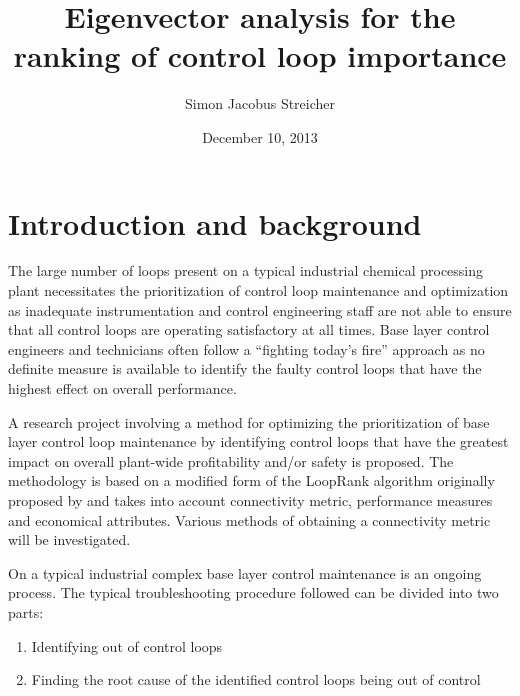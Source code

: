 \documentclass{article}
\newcommand{\subtitle}[1]{%
  \posttitle{%
    \par\end{center}
    \begin{center}\Large#1\end{center}
    \vskip0.5em}%
  }
\begin{document}


\title{Eigenvector analysis for the ranking of control loop importance}
\subtitle{Research proposal}
\date{December 10, 2013}
\author{Simon Jacobus Streicher}
\maketitle
\thispagestyle{empty}

\newpage

\tableofcontents
\thispagestyle{empty}




\newpage
{}
\pagestyle{fancy}

\section{Introduction and background}

The large number of loops present on a typical industrial chemical processing plant necessitates the prioritization of control loop maintenance and optimization as inadequate instrumentation and control engineering staff are not able to ensure that all control loops are operating satisfactory at all times.
Base layer control engineers and technicians often follow a “fighting today's fire” approach as no definite measure is available to identify the faulty control loops that have the highest effect on overall performance.

A research project involving a method for optimizing the prioritization of base layer control loop maintenance by identifying control loops that have the greatest impact on overall plant-wide profitability and/or safety is proposed.
The methodology is based on a modified form of the LoopRank algorithm originally proposed by \citet{Farenzena2009} and takes into account connectivity metric, performance measures and economical attributes.
Various methods of obtaining a connectivity metric will be investigated.

On a typical industrial complex base layer control maintenance is an ongoing process.
The typical troubleshooting procedure followed can be divided into two parts:
\begin{enumerate}
\item Identifying out of control loops
\item Finding the root cause of the identified control loops being out of control
\end{enumerate}
\end{document}
